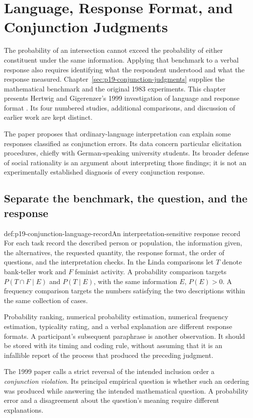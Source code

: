 \chapter{Language, Response Format, and Conjunction Judgments}
\label{sec:p19-conjunction-language}

The probability of an intersection cannot exceed the probability of
either constituent under the same information. Applying that benchmark
to a verbal response also requires identifying what the respondent
understood and what the response measured.
Chapter~\ref{sec:p19-conjunction-judgments} supplies the mathematical
benchmark and the original 1983 experiments. This chapter presents
Hertwig and Gigerenzer's 1999 investigation of language and response
format \cite{HertwigGigerenzer1999Conjunction}.
Its four numbered studies, additional comparisons, and discussion of
earlier work are kept distinct.

The paper proposes that ordinary-language interpretation can explain
some responses classified as conjunction errors. Its data concern
particular elicitation procedures, chiefly with German-speaking
university students. Its broader defense of social rationality is an
argument about interpreting those findings; it is not an experimentally
established diagnosis of every conjunction response.

\section{Separate the benchmark, the question, and the response}
\label{sec:p19-conjunction-language-targets}

\begin{hbdefinition}{def:p19-conjunction-language-record}{An interpretation-sensitive response record}
For each task record the described person or population, the information
given, the alternatives, the requested quantity, the response format,
the order of questions, and the interpretation checks.
In the Linda comparisons let \(T\) denote bank-teller work and \(F\)
feminist activity. A probability comparison targets
\(P(T\cap F\mid E)\) and \(P(T\mid E)\), with the same information
\(E\), \(P(E)>0\). A frequency comparison targets the numbers satisfying
the two descriptions within the same collection of cases.

Probability ranking, numerical probability estimation, numerical
frequency estimation, typicality rating, and a verbal explanation are
different response formats. A participant's subsequent paraphrase is
another observation. It should be stored with its timing and coding rule,
without assuming that it is an infallible report of the process that
produced the preceding judgment.

The 1999 paper calls a strict reversal of the intended inclusion order
a \emph{conjunction violation}. Its principal empirical question is
whether such an ordering was produced while answering the intended
mathematical question. A probability error and a disagreement about the
question's meaning require different explanations.
\end{hbdefinition}

